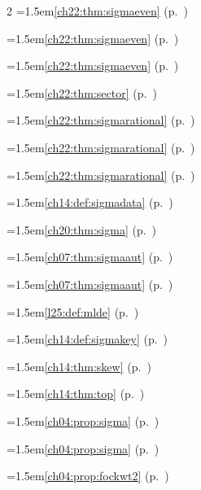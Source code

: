 \begin{multicols}{2}
\hangindent=1.5em\quad \ref{ch22:thm:sigmaeven} (p.~\pageref{ch22:thm:sigmaeven})\par
\hangindent=1.5em\quad \ref{ch22:thm:sigmaeven} (p.~\pageref{ch22:thm:sigmaeven})\par
\hangindent=1.5em\quad \ref{ch22:thm:sigmaeven} (p.~\pageref{ch22:thm:sigmaeven})\par
\hangindent=1.5em\quad \ref{ch22:thm:sector} (p.~\pageref{ch22:thm:sector})\par
\hangindent=1.5em\quad \ref{ch22:thm:sigmarational} (p.~\pageref{ch22:thm:sigmarational})\par
\hangindent=1.5em\quad \ref{ch22:thm:sigmarational} (p.~\pageref{ch22:thm:sigmarational})\par
\hangindent=1.5em\quad \ref{ch22:thm:sigmarational} (p.~\pageref{ch22:thm:sigmarational})\par
\hangindent=1.5em\quad \ref{ch14:def:sigmadata} (p.~\pageref{ch14:def:sigmadata})\par
\hangindent=1.5em\quad \ref{ch20:thm:sigma} (p.~\pageref{ch20:thm:sigma})\par
\hangindent=1.5em\quad \ref{ch07:thm:sigmaaut} (p.~\pageref{ch07:thm:sigmaaut})\par
\hangindent=1.5em\quad \ref{ch07:thm:sigmaaut} (p.~\pageref{ch07:thm:sigmaaut})\par
\hangindent=1.5em\quad \ref{l25:def:mlde} (p.~\pageref{l25:def:mlde})\par
\hangindent=1.5em\quad \ref{ch14:def:sigmakey} (p.~\pageref{ch14:def:sigmakey})\par
\hangindent=1.5em\quad \ref{ch14:thm:skew} (p.~\pageref{ch14:thm:skew})\par
\hangindent=1.5em\quad \ref{ch14:thm:top} (p.~\pageref{ch14:thm:top})\par
\hangindent=1.5em\quad \ref{ch04:prop:sigma} (p.~\pageref{ch04:prop:sigma})\par
\hangindent=1.5em\quad \ref{ch04:prop:sigma} (p.~\pageref{ch04:prop:sigma})\par
\hangindent=1.5em\quad \ref{ch04:prop:fockwt2} (p.~\pageref{ch04:prop:fockwt2})\par

\end{multicols}
